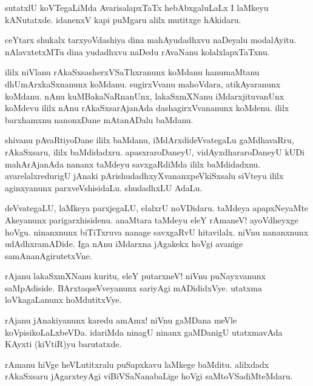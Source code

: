 \begin{mng}
sutatxlU koVTegaLiMda AvarisalapxTaTx hebAbxgaluLaLx I laMkeyu kANutatxde. idanenxV kapi puMgaru alilx mutitxge hAkidaru.
\end{mng}

\begin{mng}
ceYtarx shukalx tarxyoVdashiya dina mahAyudadhxvu naDeyalu modalAyitu. nAlavxtetxMTu dina yudadhxvu naDedu rAvaNanu kolalxlapxTaTxnu.
\end{mng}

\begin{mng}
ililx niVlanu rAkaSxsasherxVSaThxranunx koMdanu hanumaMtanu dhUmArxkaSxnanunx koMdanu. sugirxVvanu mahoVdara, atikAyaranunx koMdanu. nAnu kuMBakaNaRnanUnx, lakaSxmXNanu iMdarxjituvanUnx koMdevu ililx nAnu rAkaSxsarAjanAda dashagirxVvananunx koMdenu. ililx barxhamxnu nanonxDane mAtanADalu baMdanu.
\end{mng}

\begin{mng}
shivanu pAvaRtiyoDane ililx baMdanu, iMdArxdideVvategaLu gaMdhavaRru, rAkaSxsaru, ililx baMdidadxru. apasxraroDaneyU, vidAyxdhararoDaneyU kUDi mahArAjanAda nananx taMdeyu savxgaRdiMda ililx baMdidadxnu. avarelalxredurigU jAnaki pArishudadhxyXvananxpeVkiSxsalu siVteyu ililx aginxyanunx parxveVshisidaLu. shudadhxLU AdaLu.
\end{mng}

\begin{mng}
deVvategaLU, laMkeya parxjegaLU, elalxrU noVDidaru. taMdeya apapxNeyaMte Akeyanunx parigarxhisidenu. anaMtara taMdeyu eleY rAmaneV! ayoVdheyxge hoVgu. ninanxnunx biTiTxruva nanage savxgaRvU hitavilalx. niVnu nananxnunx udAdhxramADide. Iga nAnu iMdarxna jAgakekx hoVgi avanige samAnanAgirutetxVne.
\end{mng}

\begin{mng}
rAjanu lakaSxmXNanu kuritu, eleY putarxneV! niVnu puNayxvanunx saMpAdiside. BArxtaqseVveyanunx sariyAgi mADididxVye. utatxma loVkagaLanunx hoMdutitxVye.
\end{mng}

\begin{mng}
rAjanu jAnakiyanunx karedu amAmx! niVnu gaMDana meVle koVpisikoLaLxbeVDa. idariMda ninagU ninanx gaMDanigU utatxmavAda KAyxti (kiVtiR)yu barutatxde.
\end{mng}

\begin{mng}
rAmanu hiVge heVLutitxralu puSapxkavu laMkege baMditu. alilxdadx rAkaSxsaru jAgarxteyAgi viBiVSaNanabaLige hoVgi saMtoVSadiMteMdaru.
\end{mng}

